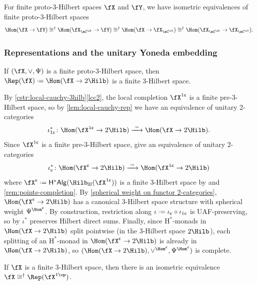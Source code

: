 \documentclass[12pt,reqno]{amsart}
\newcommand{\C}{\eC}
\newcommand{\Hstar}{\ensuremath{\mathrm{H}^{*}}}
\newcommand{\cent}{\textup{\textcent}}
\DeclareRobustCommand{\coloneq}{\mathrel{\vcenter{\baselineskip0.5ex\lineskiplimit0pt\hbox{\scriptsize{\upshape.}}\hbox{\scriptsize{\upshape.}}}}=}
\begin{document}
\begin{corollary}
\label{cor:XCXcongX implies homs-2}
For finite proto-3-Hilbert spaces $\fX$ and $\fY$, we have isometric equivalences of finite proto-3-Hilbert spaces
\[
\Hom(\fX\to\fY)\cong^\dag\Hom(\fX_{\C^\fX}\to\fY)\cong^\dag\Hom(\fX\to\fX_{\C^\fY})\cong^\dag\Hom(\fX_{\C^\fX}\to\fX_{\C^\fY}).
\]
\end{corollary}

\subsubsection{Representations and the unitary Yoneda embedding}

\begin{corollary}\label{prop:rep-is-3hilb}
  If $(\fX,\vee,\Psi)$ is a finite proto-3-Hilbert space, then $\Rep(\fX)\coloneq\Hom(\fX\to 2\Hilb)$ is a finite 3-Hilbert space.
\end{corollary}

\begin{pf}
  By \cref{cstr:local-cauchy-3hilb}\ref{lcc2}, the local completion $\fX^{1\cent}$ is a finite pre-3-Hilbert space, so by \cref{lem:local-cauchy-rep} we have an equivalence of unitary 2-categories
  \[
    \iota_{1\cent}^*\colon\Hom(\fX^{1\cent}\to 2\Hilb) \xrightarrow{\;\sim\;} \Hom(\fX\to2\Hilb).
  \]
  Since $\fX^{1\cent}$ is a finite pre-3-Hilbert space, \cite[Props. 4.28 and 4.43]{3Hilb} give an equivalence of unitary 2-categories
  \[
    \iota_\cent^*\colon\Hom(\fX^\cent\to 2\Hilb) \xrightarrow{\;\sim\;} \Hom(\fX^{1\cent}\to 2\Hilb)
  \]
  where $\fX^\cent\coloneq\mathsf{H}^*\mathsf{Alg}(\Hilb_\boxplus(\fX^{1\cent}))$ is a finite 3-Hilbert space by \cite[Lem. 4.42 and Prop. 4.44]{3Hilb} and \cref{rem:points-completion}. By \cref{spherical weight on functor 2-categories}, $\Hom(\fX^\cent\to 2\Hilb)$ has a canonical 3-Hilbert space structure with spherical weight $\Psi^{\Hom^\cent}$. By construction, restriction along $\iota\coloneq\iota_\cent\circ\iota_{1\cent}$ is UAF-preserving, so by \cite[Lem. 4.23]{3Hilb} $\iota^*$ preserves Hilbert direct sums. Finally, since $\Hstar$-monads in $\Hom(\fX\to2\Hilb)$ split pointwise (in the 3-Hilbert space $2\Hilb$), each splitting of an $\Hstar$-monad in $\Hom(\fX^\cent\to 2\Hilb)$ is already in $\Hom(\fX\to2\Hilb)$, so $(\Hom(\fX\to2\Hilb),\vee^{\Hom^{\cent}},\Psi^{\Hom^{\cent}})$ is complete.
\end{pf}

\begin{corollary}
    \label{3hilb equiv to its reps}
    If $\fX$ is a finite 3-Hilbert space, then there is an isometric equivalence $\fX\cong^\dag\Rep(\fX^{1\op})$.
\end{corollary}
\end{document}
